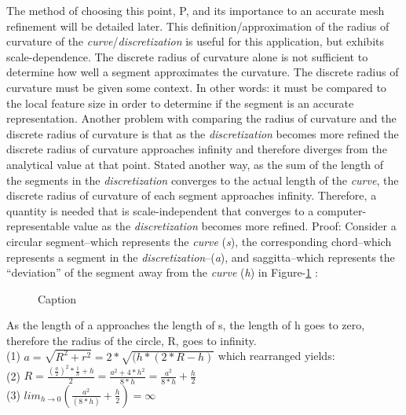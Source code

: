 \documentclass[preprint,12pt]{elsarticle}
\begin{document}
\noindent The method of choosing this point, P, and its importance to an accurate mesh refinement will be detailed later. This definition/approximation of the radius of curvature of the \textit{curve}/\textit{discretization} is useful for this application, but exhibits scale-dependence. The discrete radius of curvature alone is not sufficient to determine how well a segment approximates the curvature. The discrete radius of curvature must be given some context. In other words: it must be compared to the local feature size in order to determine if the segment is an accurate representation. Another problem with comparing the radius of curvature and the discrete radius of curvature is that as the \textit{discretization} becomes more refined the discrete radius of curvature approaches infinity and therefore diverges from the analytical value at that point. Stated another way, as the sum of the length of the segments in the \textit{discretization} converges to the actual length of the \textit{curve}, the discrete radius of curvature of each segment approaches infinity. Therefore, a quantity is needed that is scale-independent that converges to a computer-representable value as the \textit{discretization} becomes more refined.
Proof: Consider a circular segment--which represents the \textit{curve} (\textit{s}), the corresponding chord--which represents a segment in the \textit{discretization}--(\textit{a}), and saggitta--which represents the ``deviation'' of the segment away from the \textit{curve} (\textit{h}) in Figure-\ref{CircleGeometry} :
\begin{figure}
  \caption{\label{CircleGeometry} Caption}
\end{figure}

As the length of a approaches the length of s, the length of h goes to zero, therefore the radius of the circle, R, goes to infinity.\\
(1) $a=\sqrt{R^2+r^2}=2*\sqrt{(h*(2*R-h)}$ \hspace{2pt} which rearranged yields: \\
(2) $R=\frac{(\frac{a}{2})^2*\frac{1}{h}+h}{2}=
\frac{a^2+4*h^2}{8*h}=\frac{a^2}{8*h}+\frac{h}{2}$\\
(3) $lim_{h\to0}(\frac{a^2}{(8*h)}+\frac{h}{2})=\infty$ \\
\end{document}

